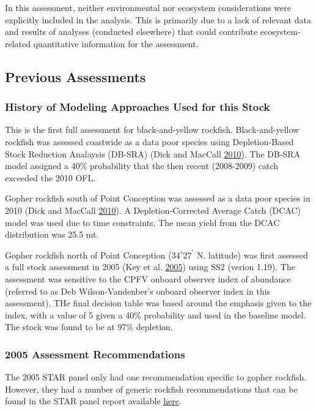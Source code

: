\documentclass[12pt,]{article}
\begin{document}
In this assessment, neither environmental nor ecosystem considerations
were explicitly included in the analysis. This is primarily due to a
lack of relevant data and results of analyses (conducted elsewhere) that
could contribute ecosystem-related quantitative information for the
assessment.

\subsection{Previous Assessments}\label{previous-assessments}

\subsubsection{History of Modeling Approaches Used for this
Stock}\label{history-of-modeling-approaches-used-for-this-stock}

This is the first full assessment for black-and-yellow rockfish.
Black-and-yellow rockfish was assessed coastwide as a data poor species
using Depletion-Based Stock Reduction Analaysis (DB-SRA) (Dick and
MacCall \protect\hyperlink{ref-Dick2010}{2010}). The DB-SRA model
assigned a 40\% probability that the then recent (2008-2009) catch
exceeded the 2010 OFL.

Gopher rockfish south of Point Conception was assessed as a data poor
species in 2010 (Dick and MacCall
\protect\hyperlink{ref-Dick2010}{2010}). A Depletion-Corrected Average
Catch (DCAC) model was used due to time constraints. The mean yield from
the DCAC distribution was 25.5 mt.

Gopher rockfish north of Point Conception (\(34^\circ 27^\prime\) N.
latitude) was first assessed a full stock assessment in 2005 (Key et al.
\protect\hyperlink{ref-Key2005}{2005}) using SS2 (verion 1.19). The
assessment was sensitive to the CPFV onboard observer index of abundance
(referred to as Deb Wilson-Vandenber's onboard observer index in this
assessment). THe final decision table was based around the emphasis
given to the index, with a value of 5 given a 40\% probability and used
in the baseline model. The stock was found to be at 97\% depletion.

\subsubsection{2005 Assessment
Recommendations}\label{assessment-recommendations}

The 2005 STAR panel only had one recommendation specific to gopher
rockfish. However, they had a number of generic rockfish recommendations
that can be found in the STAR panel report available
\href{https://www.pcouncil.org/groundfish/stock-assessments/by-species/gopher-rockfish/}{here}.
\end{document}
